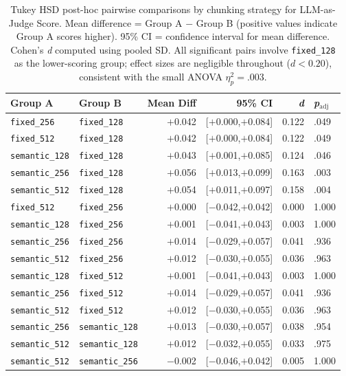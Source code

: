 \begin{table}[h]
\centering
\caption{Tukey HSD post-hoc pairwise comparisons by chunking strategy for LLM-as-Judge Score. Mean difference = Group A $-$ Group B (positive values indicate Group A scores higher). 95\% CI = confidence interval for mean difference. Cohen's \textit{d} computed using pooled SD. All significant pairs involve \texttt{fixed\_128} as the lower-scoring group; effect sizes are negligible throughout ($d < 0.20$), consistent with the small ANOVA $\eta^2_p = .003$.}
\label{tab:tukey_strategy}
\begin{tabular}{llrrrl}
\toprule
\textbf{Group A} & \textbf{Group B} & \textbf{Mean Diff} & \textbf{95\% CI} & \textbf{\textit{d}} & \textbf{\textit{p}$_{\text{adj}}$} \\
\midrule
\texttt{fixed\_256}   & \texttt{fixed\_128}   & $+$0.042 & [$+$0.000,\hphantom{$+$}$+$0.084] & 0.122 & .049 \\
\texttt{fixed\_512}   & \texttt{fixed\_128}   & $+$0.042 & [$+$0.000,\hphantom{$+$}$+$0.084] & 0.122 & .049 \\
\texttt{semantic\_128} & \texttt{fixed\_128}  & $+$0.043 & [$+$0.001,\hphantom{$+$}$+$0.085] & 0.124 & .046 \\
\texttt{semantic\_256} & \texttt{fixed\_128}  & $+$0.056 & [$+$0.013,\hphantom{$+$}$+$0.099] & 0.163 & .003 \\
\texttt{semantic\_512} & \texttt{fixed\_128}  & $+$0.054 & [$+$0.011,\hphantom{$+$}$+$0.097] & 0.158 & .004 \\
\midrule
\texttt{fixed\_512}   & \texttt{fixed\_256}   & $+$0.000 & [$-$0.042,\hphantom{$-$}$+$0.042] & 0.000 & 1.000 \\
\texttt{semantic\_128} & \texttt{fixed\_256}  & $+$0.001 & [$-$0.041,\hphantom{$-$}$+$0.043] & 0.003 & 1.000 \\
\texttt{semantic\_256} & \texttt{fixed\_256}  & $+$0.014 & [$-$0.029,\hphantom{$-$}$+$0.057] & 0.041 & .936 \\
\texttt{semantic\_512} & \texttt{fixed\_256}  & $+$0.012 & [$-$0.030,\hphantom{$-$}$+$0.055] & 0.036 & .963 \\
\texttt{semantic\_128} & \texttt{fixed\_512}  & $+$0.001 & [$-$0.041,\hphantom{$-$}$+$0.043] & 0.003 & 1.000 \\
\texttt{semantic\_256} & \texttt{fixed\_512}  & $+$0.014 & [$-$0.029,\hphantom{$-$}$+$0.057] & 0.041 & .936 \\
\texttt{semantic\_512} & \texttt{fixed\_512}  & $+$0.012 & [$-$0.030,\hphantom{$-$}$+$0.055] & 0.036 & .963 \\
\texttt{semantic\_256} & \texttt{semantic\_128} & $+$0.013 & [$-$0.030,\hphantom{$-$}$+$0.057] & 0.038 & .954 \\
\texttt{semantic\_512} & \texttt{semantic\_128} & $+$0.012 & [$-$0.032,\hphantom{$-$}$+$0.055] & 0.033 & .975 \\
\texttt{semantic\_512} & \texttt{semantic\_256} & $-$0.002 & [$-$0.046,\hphantom{$-$}$+$0.042] & 0.005 & 1.000 \\
\bottomrule
\end{tabular}
\end{table}
